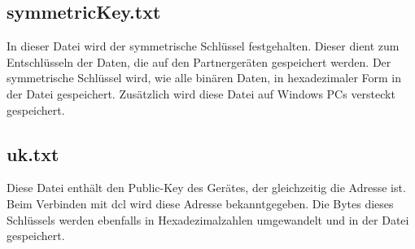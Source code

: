 \subsection{symmetricKey.txt} \label{symmetricKey}
In dieser Datei wird der symmetrische Schlüssel festgehalten. Dieser dient zum Entschlüsseln der Daten, die auf den Partnergeräten gespeichert werden. Der symmetrische Schlüssel wird, wie alle binären Daten, in hexadezimaler Form in der Datei gespeichert. Zusätzlich wird diese Datei auf Windows PCs versteckt gespeichert.

\subsection{uk.txt}
Diese Datei enthält den Public-Key des Gerätes, der gleichzeitig die Adresse ist. Beim Verbinden mit \gls{dcl} wird diese Adresse bekanntgegeben. Die Bytes dieses Schlüssels werden ebenfalls in Hexadezimalzahlen umgewandelt und in der Datei gespeichert.
